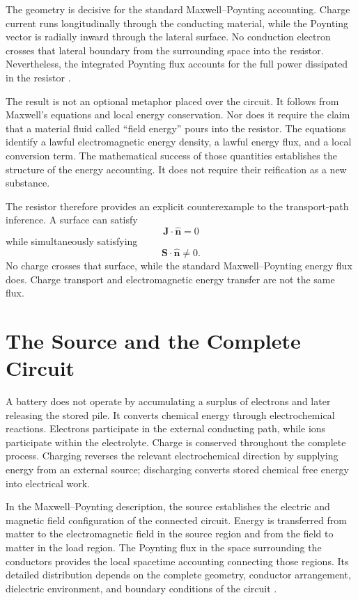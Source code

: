 \documentclass[12pt,onecolumn]{article}
\begin{document}
The geometry is decisive for the standard Maxwell--Poynting accounting. Charge current runs longitudinally through the conducting material, while the Poynting vector is radially inward through the lateral surface. No conduction electron crosses that lateral boundary from the surrounding space into the resistor. Nevertheless, the integrated Poynting flux accounts for the full power dissipated in the resistor \cite{feynman,griffiths}.

The result is not an optional metaphor placed over the circuit. It follows from Maxwell's equations and local energy conservation. Nor does it require the claim that a material fluid called ``field energy'' pours into the resistor. The equations identify a lawful electromagnetic energy density, a lawful energy flux, and a local conversion term. The mathematical success of those quantities establishes the structure of the energy accounting. It does not require their reification as a new substance.

The resistor therefore provides an explicit counterexample to the transport-path inference. A surface can satisfy
\[
\mathbf J\cdot\hat{\mathbf n}=0
\]
while simultaneously satisfying
\[
\mathbf S\cdot\hat{\mathbf n}\neq 0.
\]
No charge crosses that surface, while the standard Maxwell--Poynting energy flux does. Charge transport and electromagnetic energy transfer are not the same flux.


\section{The Source and the Complete Circuit}

A battery does not operate by accumulating a surplus of electrons and later releasing the stored pile. It converts chemical energy through electrochemical reactions. Electrons participate in the external conducting path, while ions participate within the electrolyte. Charge is conserved throughout the complete process. Charging reverses the relevant electrochemical direction by supplying energy from an external source; discharging converts stored chemical free energy into electrical work.

In the Maxwell--Poynting description, the source establishes the electric and magnetic field configuration of the connected circuit. Energy is transferred from matter to the electromagnetic field in the source region and from the field to matter in the load region. The Poynting flux in the space surrounding the conductors provides the local spacetime accounting connecting those regions. Its detailed distribution depends on the complete geometry, conductor arrangement, dielectric environment, and boundary conditions of the circuit \cite{poynting1884,hausmelcher}.
\end{document}
